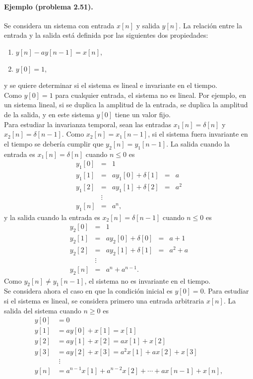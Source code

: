 \documentclass[a4paper]{report}
\begin{document}
\paragraph{Ejemplo (problema 2.51).} Se considera un sistema con entrada \(x[n]\) y salida \(y[n]\). La relación entre la entrada y la salida está definida por las siguientes dos propiedades:
\begin{enumerate}
 \item \(y[n]-ay[n-1]=x[n]\),
 \item \(y[0]=1\),
\end{enumerate}
y se quiere determinar si el sistema es lineal e invariante en el tiempo.\\
Como \(y[0]=1\) para cualquier entrada, el sistema no es lineal. Por ejemplo, en un sistema lineal, si se duplica la amplitud de la entrada, se duplica la amplitud de la salida, y en este sistema \(y[0]\) tiene un valor fijo.\\
Para estudiar la invarianza temporal, sean las entradas \(x_1[n]=\delta[n]\) y \(x_2[n]=\delta[n-1]\). Como \(x_2[n]=x_1[n-1]\), si el sistema fuera invariante en el tiempo se debería cumplir que \(y_2[n]=y_1[n-1]\). La salida cuando la entrada es \(x_1[n]=\delta[n]\) cuando \(n\leq0\) es
\[
 \begin{array}{lclcl}
  y_1[0]&=&1&&\\
  y_1[1]&=&ay_1[0]+\delta[1]&=&a\\
  y_1[2]&=&ay_1[1]+\delta[2]&=&a^2\\
  &\vdots&&&\\
  y_1[n]&=&a^n,&&
 \end{array}
\]
y la salida cuando la entrada es \(x_2[n]=\delta[n-1]\) cuando \(n\leq0\) es
\[
 \begin{array}{lclcl}
  y_2[0]&=&1&&\\
  y_2[1]&=&ay_2[0]+\delta[0]&=&a+1\\
  y_2[2]&=&ay_2[1]+\delta[1]&=&a^2+a\\
  &\vdots&&&\\
  y_2[n]&=&a^n+a^{n-1}.&&
 \end{array}
\]
Como \(y_2[n]\neq y_1[n-1]\), el sistema no es invariante en el tiempo.\\
Se considera ahora el caso en que la condición inicial es \(y[0]=0\). Para estudiar si el sistema es lineal, se considera primero una entrada arbitraria \(x[n]\). La salida del sistema cuando \(n\geq0\) es 
\begin{align*}
  y[0]&=0\\
  y[1]&=ay[0]+x[1]=x[1]\\
  y[2]&=ay[1]+x[2]=ax[1]+x[2]\\
  y[3]&=ay[2]+x[3]=a^2x[1]+ax[2]+x[3]\\
  &\;\vdots\\
  y[n]&=a^{n-1}x[1]+a^{n-2}x[2]+\cdots+ax[n-1]+x[n],
\end{align*}
\end{document}
